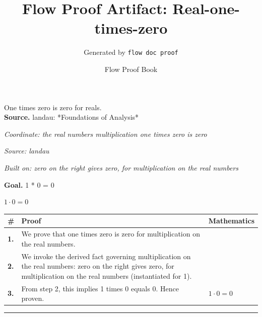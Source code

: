 \documentclass[11pt]{article}
\title{Flow Proof Artifact: Real-one-times-zero}
\author{Generated by \texttt{flow doc proof}}
\date{Flow Proof Book}
\theoremstyle{definition}
\begin{document}
\maketitle
One times zero is zero for reals.\\[0.5em]
\textbf{Source.} landau: *Foundations of Analysis*\\[0.5em]
\bigskip
{}\par
\smallskip\noindent\textit{Coordinate: the real numbers \cdot multiplication \cdot one times zero is zero}\par
\smallskip\noindent\textit{Source: landau}\par
\smallskip\noindent\textit{Built on: zero on the right gives zero, for multiplication on the real numbers}\par
\medskip
\noindent\textbf{Goal.} 1 * 0 = 0\par
\noindent$\displaystyle 1 \cdot 0 = 0$\par
\medskip
\noindent
\begin{tabular}{@{} >{\raggedright\arraybackslash}p{} >{\raggedright\arraybackslash}p{} >{\raggedleft\arraybackslash}p{} @{}}
\textbf{\#} & \textbf{Proof} & \textbf{Mathematics} \\
\midrule
\textbf{1.} & We prove that one times zero is zero for multiplication on the real numbers. & \\[0.45em]
\textbf{2.} & We invoke the derived fact governing multiplication on the real numbers: zero on the right gives zero, for multiplication on the real numbers (instantiated for 1). & \\[0.45em]
\textbf{3.} & From step 2, this implies 1 times 0 equals 0. Hence proven. & $\displaystyle 1 \cdot 0 = 0$ \\[0.45em]
\bottomrule
\end{tabular}
\label{thm:Real-multiplication-one_times_zero_is_zero}
\par\medskip\hrule
\end{document}
